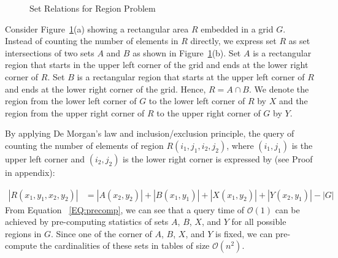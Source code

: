 \documentclass[AMA,LATO1COL]{WileyNJD-v2}
\newcommand\bigo{\mathcal O}
\begin{document}
\begin{figure}[h]
     \begin{center}
\end{center}
\vspace{-10pt}
\caption{Set Relations for Region Problem}\label{fig:example}
\end{figure}

Consider Figure~\ref{fig:example}(a) showing a rectangular area $R$ embedded in a grid $G$. Instead of counting the number of elements in $R$ directly, we express set $R$ as set intersections of two sets $A$ and $B$ as shown in Figure~\ref{fig:example}(b). Set $A$ is a rectangular region that starts in the upper left corner of the grid and ends at the lower right corner of $R$. Set $B$ is a rectangular region that starts at the upper left corner of $R$ and ends at the lower right corner of the grid. Hence, $R=A \cap B$. We denote the region from the lower left corner of $G$ to the lower left corner of $R$ by $X$ and the region from the upper right corner of $R$ to the upper right corner of $G$ by $Y$.

 By applying De Morgan's law and inclusion/exclusion principle, the query of counting the number of elements of region $R(i_1,j_1,i_2,j_2)$, where $(i_1,j_1)$ is the upper left corner and $(i_2,j_2)$ is the lower right corner is expressed by (see Proof in appendix):


\begin{equation}
\label{EQ:precomp}
\begin{split}
|R(x_1,y_1,x_2,y_2)|& = |A(x_2,y_2)| + |B(x_1,y_1)| + |X(x_1,y_2)|  + |Y(x_2,y_1)| - |G|
\end{split}
\end{equation}
\normalsize
From Equation ~\ref{EQ:precomp}, we can see that a query time of $\bigo(1)$ can be achieved by pre-computing statistics of sets $A$, $B$, $X$, and $Y$ for all possible regions in $G$. Since one of the corner of $A$, $B$, $X$, and $Y$ is fixed, we can pre-compute the cardinalities of these sets in tables of size $\bigo(n^2)$.
\end{document}

